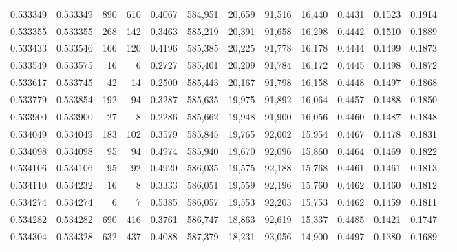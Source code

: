 \begin{tabular}{rrrrrrrrrrrrr}
0.533349 & 0.533349 &   890 &   610 &                                     0.4067 & 584,951 &  20,659 &  91,516 &  16,440 & 0.4431 & 0.1523 & 0.1914 \\
0.533355 & 0.533355 &   268 &   142 &                                     0.3463 & 585,219 &  20,391 &  91,658 &  16,298 & 0.4442 & 0.1510 & 0.1889 \\
0.533433 & 0.533546 &   166 &   120 &                                     0.4196 & 585,385 &  20,225 &  91,778 &  16,178 & 0.4444 & 0.1499 & 0.1873 \\
0.533549 & 0.533575 &    16 &     6 &                                     0.2727 & 585,401 &  20,209 &  91,784 &  16,172 & 0.4445 & 0.1498 & 0.1872 \\
0.533617 & 0.533745 &    42 &    14 &                                     0.2500 & 585,443 &  20,167 &  91,798 &  16,158 & 0.4448 & 0.1497 & 0.1868 \\
0.533779 & 0.533854 &   192 &    94 &                                     0.3287 & 585,635 &  19,975 &  91,892 &  16,064 & 0.4457 & 0.1488 & 0.1850 \\
0.533900 & 0.533900 &    27 &     8 &                                     0.2286 & 585,662 &  19,948 &  91,900 &  16,056 & 0.4460 & 0.1487 & 0.1848 \\
0.534049 & 0.534049 &   183 &   102 &                                     0.3579 & 585,845 &  19,765 &  92,002 &  15,954 & 0.4467 & 0.1478 & 0.1831 \\
0.534098 & 0.534098 &    95 &    94 &                                     0.4974 & 585,940 &  19,670 &  92,096 &  15,860 & 0.4464 & 0.1469 & 0.1822 \\
0.534106 & 0.534106 &    95 &    92 &                                     0.4920 & 586,035 &  19,575 &  92,188 &  15,768 & 0.4461 & 0.1461 & 0.1813 \\
0.534110 & 0.534232 &    16 &     8 &                                     0.3333 & 586,051 &  19,559 &  92,196 &  15,760 & 0.4462 & 0.1460 & 0.1812 \\
0.534274 & 0.534274 &     6 &     7 &                                     0.5385 & 586,057 &  19,553 &  92,203 &  15,753 & 0.4462 & 0.1459 & 0.1811 \\
0.534282 & 0.534282 &   690 &   416 &                                     0.3761 & 586,747 &  18,863 &  92,619 &  15,337 & 0.4485 & 0.1421 & 0.1747 \\
0.534304 & 0.534328 &   632 &   437 &                                     0.4088 & 587,379 &  18,231 &  93,056 &  14,900 & 0.4497 & 0.1380 & 0.1689 \\

\end{tabular}
